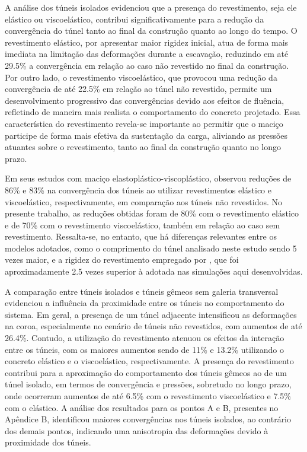 A análise dos túneis isolados evidenciou que a presença do revestimento, seja ele elástico ou viscoelástico, contribui significativamente para a redução da convergência do túnel tanto ao final da construção quanto ao longo do tempo. O revestimento elástico, por apresentar maior rigidez inicial, atua de forma mais imediata na limitação das deformações durante a escavação, reduzindo em até 29.5\% a convergência em relação ao caso não revestido no final da construção. Por outro lado, o revestimento viscoelástico, que provocou uma redução da convergência de até 22.5\% em relação ao túnel não revestido, permite um desenvolvimento progressivo das convergências devido aos efeitos de fluência, refletindo de maneira mais realista o comportamento do concreto projetado. Essa característica do revestimento revela-se importante ao permitir que o maciço participe de forma mais efetiva da sustentação da carga, aliviando as pressões atuantes sobre o revestimento, tanto ao final da construção quanto no longo prazo.

Em seus estudos com maciço elastoplástico-viscoplástico,  observou reduções de 86\% e 83\% na convergência dos túneis ao utilizar revestimentos elástico e viscoelástico, respectivamente, em comparação aos túneis não revestidos. No presente trabalho, as reduções obtidas foram de 80\% com o revestimento elástico e de 70\% com o revestimento viscoelástico, também em relação ao caso sem revestimento. Ressalta-se, no entanto, que há diferenças relevantes entre os modelos adotados, como o comprimento do túnel analisado neste estudo sendo 5 vezes maior, e a rigidez do revestimento empregado por , que foi aproximadamente 2.5 vezes superior à adotada nas simulações aqui desenvolvidas.

A comparação entre túneis isolados e túneis gêmeos sem galeria transversal evidenciou a influência da proximidade entre os túneis no comportamento do sistema. Em geral, a presença de um túnel adjacente intensificou as deformações na coroa, especialmente no cenário de túneis não revestidos, com aumentos de até 26.4\%. Contudo, a utilização do revestimento atenuou os efeitos da interação entre os túneis, com os maiores aumentos sendo de 11\% e 13.2\% utilizando o concreto elástico e o viscoelástico, respectivamente. A presença do revestimento contribui para a aproximação do comportamento dos túneis gêmeos ao de um túnel isolado, em termos de convergência e pressões, sobretudo no longo prazo, onde ocorreram aumentos de até 6.5\% com o revestimento viscoelástico e 7.5\% com o elástico. A análise dos resultados para os pontos A e B, presentes no Apêndice B, identificou maiores convergências nos túneis isolados, ao contrário dos demais pontos, indicando uma anisotropia das deformações devido à proximidade dos túneis.  

